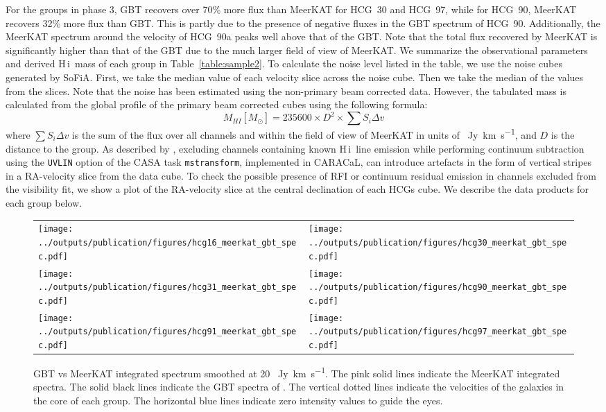 \documentclass{aa}
\newcommand{\HI}{H\,{\sc i}}
\begin{document}
For the groups in phase 3, GBT recovers over 70\% more flux than MeerKAT for HCG~30 and HCG~97, while for HCG~90, MeerKAT recovers 32\% more flux than GBT. This is partly due to the presence of negative fluxes in the GBT spectrum of HCG~90. Additionally, the MeerKAT spectrum around the velocity of HCG~90a peaks well above that of the GBT. Note that the total flux recovered by MeerKAT is significantly higher than that of the GBT due to the much larger field of view of MeerKAT. 
We summarize the observational parameters and derived \HI\ mass of each group in Table~\ref{table:sample2}. To calculate the noise level listed in the table, 
we use the noise cubes generated by SoFiA. First, we take the median value of each velocity slice across the noise cube. Then we take the median of the values from the slices.
Note that the noise has been estimated using the non-primary beam corrected data. However, the tabulated mass is calculated from the global profile of the primary beam corrected cubes using the following formula:
\begin{equation}
	M_{HI}[M_{\odot}] = 235600 \times D^2 \times \sum S_{i}\Delta v
\end{equation}
where $\sum S_{i}\Delta v $ is the sum of the flux over all channels and within the field of view of MeerKAT in units of \qty{}{Jy~km~s^{-1}}, and $D$ is the distance to the group.
As described by \citet{2023A&A...673A.146S}, excluding channels containing known \HI\ line emission while performing continuum subtraction using the \texttt{UVLIN} option of the CASA task 
\texttt{mstransform}, implemented in CARACaL, can introduce artefacts in the form of vertical stripes in a RA-velocity slice from the data cube. To check the possible presence of RFI or continuum residual emission in channels excluded from the visibility fit, we show a plot of the RA-velocity slice at the central declination of each HCGs cube. We describe the data products for each group below.            
\begin{figure*}
\begin{tabular}{ll}
    \texttt{[image: ../outputs/publication/figures/hcg16\_meerkat\_gbt\_spec.pdf]}&
    \texttt{[image: ../outputs/publication/figures/hcg30\_meerkat\_gbt\_spec.pdf]}\\
    \texttt{[image: ../outputs/publication/figures/hcg31\_meerkat\_gbt\_spec.pdf]}&
    \texttt{[image: ../outputs/publication/figures/hcg90\_meerkat\_gbt\_spec.pdf]}\\
    \texttt{[image: ../outputs/publication/figures/hcg91\_meerkat\_gbt\_spec.pdf]}&
    \texttt{[image: ../outputs/publication/figures/hcg97\_meerkat\_gbt\_spec.pdf]}
  \end{tabular}
	\caption{GBT vs MeerKAT integrated spectrum smoothed at 20 \qty{}{Jy~km~s^{-1}}. The pink solid lines indicate the MeerKAT integrated spectra. The solid black lines indicate the GBT spectra of \citet{2010ApJ...710..385B}. 
    The vertical dotted lines indicate the velocities of the galaxies in the core of each group. The horizontal blue lines indicate zero intensity values to guide the eyes.}  
  \label{fig:spectrum}
 \end{figure*}
\end{document}
